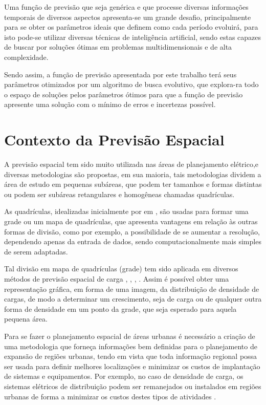 Uma função de previsão que seja genérica e que processe diversas informações temporais de diversos aspectos apresenta-se um grande desafio, principalmente para se obter os parâmetros ideais que definem como cada período evoluirá, para isto pode-se utilizar diversas técnicas de inteligência artificial, sendo estas capazes de buscar por soluções ótimas em problemas multidimensionais e de alta complexidade. 

Sendo assim, a função de previsão apresentada por este trabalho terá seus parâmetros otimizados por um algoritmo de busca evolutivo, que explora-ra todo o espaço de soluções pelos parâmetros ótimos para que a função de previsão apresente uma solução com o mínimo de erros e incertezas possível.


\section{Contexto da Previsão Espacial}

A previsão espacial tem sido muito utilizada nas áreas de planejamento elétrico,e diversas metodologias são propostas, em sua maioria, tais metodologias dividem a área de estudo em pequenas subáreas, que podem ter tamanhos e formas distintas ou podem ser subáreas retangulares e homogêneas chamadas quadrículas.

As quadrículas, idealizadas inicialmente por \citeauthor{arango1993mthesis} em \cite{arango1993mthesis}, são usadas para formar uma grade ou um mapa de quadrículas, que  apresenta vantagens em relação às outras formas de divisão, como por exemplo, a possibilidade de se aumentar a resolução, dependendo apenas da entrada de dados, sendo computacionalmente mais simples de serem adaptadas.

Tal divisão em mapa de quadrículas (grade) tem sido aplicada em diversos métodos de previsão espacial de carga \cite{arango1993mthesis}, \cite{willis2002spatial}, \cite{melo2012multi}, \cite{arango2004spatial}. Assim é possível obter uma representação gráfica, em forma de uma imagem, da distribuição de densidade de cargas, de modo a determinar um crescimento, seja de carga ou de qualquer outra forma de densidade em um ponto da grade, que seja esperado para aquela pequena área. 

Para se fazer o planejamento espacial de áreas urbanas é necessário a criação de uma metodologia que forneça informações bem definidas para o planejamento de expansão de regiões urbanas, tendo em vista que toda informação regional possa ser usada para definir melhores localizações e minimizar os custos de implantação de sistemas e equipamentos. Por exemplo, no caso de densidade de carga, os sistemas elétricos de distribuição podem ser remanejados ou instalados em regiões urbanas de forma a minimizar os custos destes tipos de atividades \cite{willis2007spatial}.    

